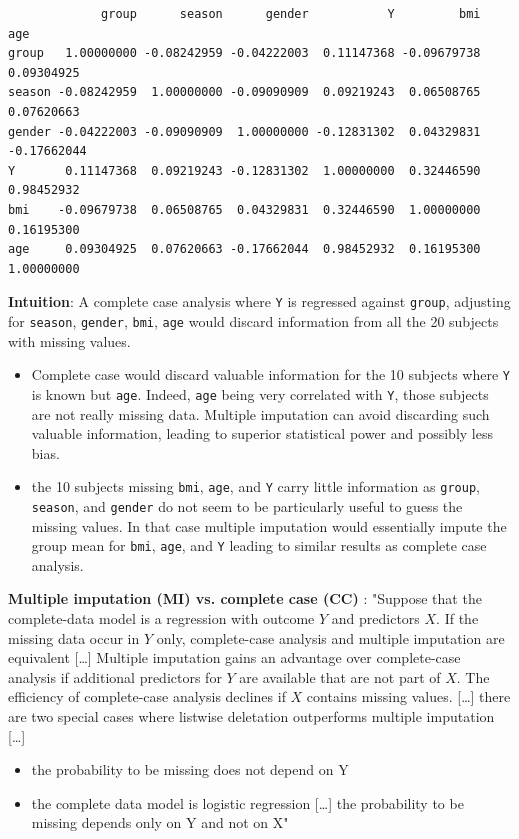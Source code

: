 \documentclass[12pt]{article}
\begin{document}
\label{}
\begin{verbatim}
             group      season      gender           Y         bmi         age
group   1.00000000 -0.08242959 -0.04222003  0.11147368 -0.09679738  0.09304925
season -0.08242959  1.00000000 -0.09090909  0.09219243  0.06508765  0.07620663
gender -0.04222003 -0.09090909  1.00000000 -0.12831302  0.04329831 -0.17662044
Y       0.11147368  0.09219243 -0.12831302  1.00000000  0.32446590  0.98452932
bmi    -0.09679738  0.06508765  0.04329831  0.32446590  1.00000000  0.16195300
age     0.09304925  0.07620663 -0.17662044  0.98452932  0.16195300  1.00000000
\end{verbatim}


\textbf{Intuition}: A complete case analysis where \texttt{Y} is regressed against
\texttt{group}, adjusting for \texttt{season}, \texttt{gender}, \texttt{bmi}, \texttt{age} would discard
information from all the 20 subjects with missing values.
\begin{itemize}
\item Complete case would discard valuable information for the 10 subjects
where \texttt{Y} is known but \texttt{age}. Indeed, \texttt{age} being very correlated
with \texttt{Y}, those subjects are not really missing data. Multiple
imputation can avoid discarding such valuable information, leading
to superior statistical power and possibly less bias.
\item the 10 subjects missing \texttt{bmi}, \texttt{age}, and \texttt{Y} carry little
information as \texttt{group}, \texttt{season}, and \texttt{gender} do not seem to be
particularly useful to guess the missing values. In that case
multiple imputation would essentially impute the group mean for
\texttt{bmi}, \texttt{age}, and \texttt{Y} leading to similar results as complete case
analysis.
\end{itemize}

\clearpage

\textbf{Multiple imputation (MI) vs. complete case (CC)} \citep{vanbuuren2018}:
  "Suppose that the complete-data model is a regression with outcome
  \(Y\) and predictors \(X\). If the missing data occur in \(Y\) only,
  complete-case analysis and multiple imputation are equivalent [\ldots{}]
  Multiple imputation gains an advantage over complete-case analysis
  if additional predictors for \(Y\) are available that are not part
  of \(X\). The efficiency of complete-case analysis declines if \(X\)
  contains missing values. [\ldots{}] there are two special cases where
  listwise deletation outperforms multiple imputation [\ldots{}]
\begin{itemize}
\item the probability to be missing does not depend on Y
\item the complete data model is logistic regression [\ldots{}] the
probability to be missing depends only on Y and not on X"
\end{itemize}
\end{document}
